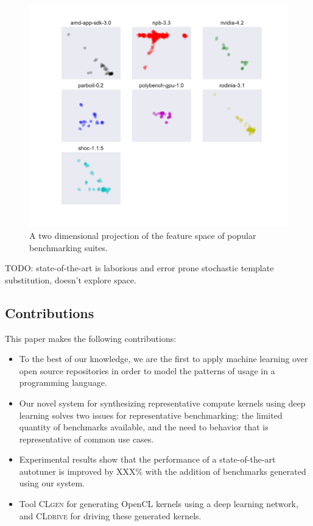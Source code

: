 \documentclass[preprint,nonatbib,10pt,nocopyrightspace]{sigplanconf}
\begin{document}
\begin{figure}%
  \includegraphics[width=\columnwidth]{img/pca-suites}
  \caption{%
    A two dimensional projection of the feature space of popular
    benchmarking suites.%
  }
  \label{fig:pca-benchmarks}
\end{figure}

TODO: state-of-the-art is laborious and error prone stochastic
template substitution, doesn't explore space.


\subsection{Contributions}

This paper makes the following contributions:%
\begin{itemize}
\item To the best of our knowledge, we are the first to apply machine
  learning over open source repositories in order to model the
  patterns of usage in a programming language.
\item Our novel system for synthesizing representative compute kernels
  using deep learning solves two issues for representative
  benchmarking: the limited quantity of benchmarks available, and the
  need to behavior that is representative of common use cases.
\item Experimental results show that the performance of a
  state-of-the-art autotuner is improved by XXX\% with the addition of
  benchmarks generated using our system.
\item Tool \textsc{CLgen} for generating OpenCL kernels using a deep
  learning network, and \textsc{CLdrive} for driving these generated
  kernels.
\end{itemize}
\end{document}

